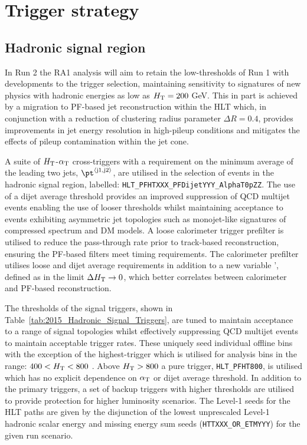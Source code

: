 \section{Trigger strategy}
\label{sec:triggers}


\subsection{Hadronic signal region\label{sec:hadronic_signal_region}}

In Run 2 the RA1 analysis will aim to retain the low-thresholds of Run 1 with developments 
to the trigger selection, maintaining sensitivity to signatures of new physics with hadronic 
energies as low as $\mbox{$H_\text{T}$} = 200$ GeV. This in part is achieved by a migration to PF-based 
jet reconstruction within the HLT which, in conjunction with a reduction of clustering radius 
parameter $\Delta R = 0.4$, provides improvements in jet energy resolution in high-pileup 
conditions and mitigates the effects of pileup contamination within the jet cone.

A suite of $\mbox{$H_\text{T}$}$-$\alpha_{\text{T}}$ cross-triggers with a requirement on the minimum average \pt of 
the leading two jets, $\pt^{\rm \left<j1,j2\right>}$, are utilised in the selection of events in 
the hadronic signal region, labelled: \verb!HLT_PFHTXXX_PFDijetYYY_AlphaT0pZZ!. The use of a 
dijet average threshold provides an improved suppression of QCD multijet events enabling the use 
of looser \alphat thresholds whilst maintaining acceptance to events exhibiting asymmetric jet 
topologies such as monojet-like signatures of compressed spectrum and DM models. A loose 
calorimeter trigger prefilter is utilised to reduce the pass-through rate prior to track-based 
reconstruction, ensuring the PF-based filters meet timing requirements. The calorimeter prefilter 
utilises loose \scalht and dijet average \pt requirements in addition to a new variable \alphat', 
defined as \alphat in the limit $\Delta\mbox{$H_\text{T}$} \rightarrow 0$, which better correlates \alphat 
between calorimeter and PF-based reconstruction.

The thresholds of the signal triggers, shown in Table~\ref{tab:2015_Hadronic_Signal_Triggers}, are 
tuned to maintain acceptance to a range of signal topologies whilst effectively suppressing QCD 
multijet events to maintain acceptable trigger rates. These uniquely seed individual offline \scalht 
bins with the exception of the highest-\scalht trigger which is utilised for analysis bins in the range: 
$400 < \mbox{$H_\text{T}$} < 800$ \GeV. Above $\mbox{$H_\text{T}$} > 800$ a pure \scalht trigger, \verb!HLT_PFHT800!, is utilised 
which has no explicit dependence on $\alpha_{\text{T}}$ or dijet average threshold. In addition to the primary 
triggers, a set of backup triggers with higher thresholds are utilised to provide protection for higher 
luminosity scenarios. The Level-1 seeds for the HLT paths are given by the disjunction of the lowest 
unprescaled Level-1 hadronic scalar energy and missing energy sum seeds (\verb!HTTXXX_OR_ETMYYY!) for 
the given run scenario.


